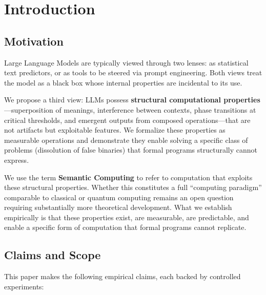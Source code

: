 \documentclass[11pt,a4paper]{article}
\begin{document}
\begin{abstract}
the output space is undefined before computation---for which LLM structural properties provide capabilities that formal computation lacks.
\end{abstract}

\section{Introduction}

\subsection{Motivation}

Large Language Models are typically viewed through two lenses: as statistical text predictors, or as tools to be steered via prompt engineering. Both views treat the model as a black box whose internal properties are incidental to its use.

We propose a third view: LLMs possess \textbf{structural computational properties}---superposition of meanings, interference between contexts, phase transitions at critical thresholds, and emergent outputs from composed operations---that are not artifacts but exploitable features. We formalize these properties as measurable operations and demonstrate they enable solving a specific class of problems (dissolution of false binaries) that formal programs structurally cannot express.

We use the term \textbf{Semantic Computing} to refer to computation that exploits these structural properties. Whether this constitutes a full ``computing paradigm'' comparable to classical or quantum computing remains an open question requiring substantially more theoretical development. What we establish empirically is that these properties exist, are measurable, are predictable, and enable a specific form of computation that formal programs cannot replicate.

\subsection{Claims and Scope}

This paper makes the following empirical claims, each backed by controlled experiments:
\end{document}
